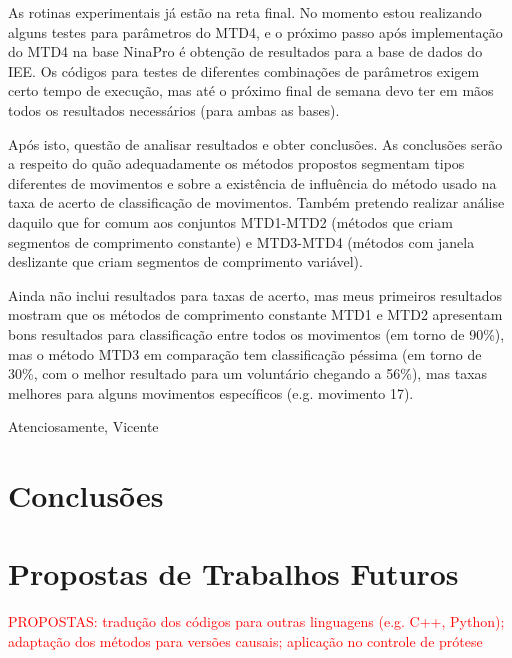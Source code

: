 As rotinas experimentais já estão na reta final. No momento estou realizando alguns testes para parâmetros do MTD4, e o próximo passo após implementação do MTD4 na base NinaPro é obtenção de resultados para a base de dados do IEE. Os códigos para testes de diferentes combinações de parâmetros exigem certo tempo de execução, mas até o próximo final de semana devo ter em mãos todos os resultados necessários (para ambas as bases).

Após isto, questão de analisar resultados e obter conclusões. As conclusões serão a respeito do quão adequadamente os métodos propostos segmentam tipos diferentes de movimentos e sobre a existência de influência do método usado na taxa de acerto de classificação de movimentos. Também pretendo realizar análise daquilo que for comum aos conjuntos MTD1-MTD2 (métodos que criam segmentos de comprimento constante) e MTD3-MTD4 (métodos com janela deslizante que criam segmentos de comprimento variável).

Ainda não inclui resultados para taxas de acerto, mas meus primeiros resultados mostram que os métodos de comprimento constante MTD1 e MTD2 apresentam bons resultados para classificação entre todos os movimentos (em torno de 90\%), mas o método MTD3 em comparação tem classificação péssima (em torno de 30\%, com o melhor resultado para um voluntário chegando a 56\%), mas taxas melhores para alguns movimentos específicos (e.g. movimento 17).

Atenciosamente,
Vicente

	\chapter{Conclusões}

	\chapter{Propostas de Trabalhos Futuros}

\textcolor{red}{PROPOSTAS: tradução dos códigos para outras linguagens (e.g. C++, Python); adaptação dos métodos para versões causais; aplicação no controle de prótese}

	\postextual
	


